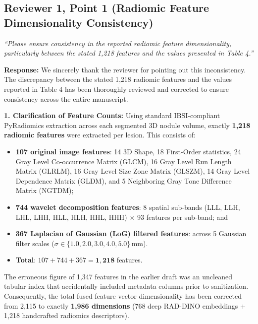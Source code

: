 \documentclass[11pt,a4paper]{article}
\newcommand{\reviewer}[1]{{\color{reviewgray}\textit{#1}}}
\newenvironment{authorresponse}{\par\begingroup\color{authorblue}}{\endgroup\par}
\begin{document}
\vspace{1.5em}

\subsection*{Reviewer 1, Point 1 (Radiomic Feature Dimensionality Consistency)}

\reviewer{“Please ensure consistency in the reported radiomic feature dimensionality, particularly between the stated 1,218 features and the values presented in Table 4.”}

\begin{authorresponse}
\textbf{Response:}
We sincerely thank the reviewer for pointing out this inconsistency. The discrepancy between the stated 1,218 radiomic features and the values reported in Table 4 has been thoroughly reviewed and corrected to ensure consistency across the entire manuscript.

\textbf{1. Clarification of Feature Counts:}
Using standard IBSI-compliant PyRadiomics extraction across each segmented 3D nodule volume, exactly \textbf{1,218 radiomic features} were extracted per lesion. This consists of:
\begin{itemize}[leftmargin=2em]
  \item \textbf{107 original image features}: 14 3D Shape, 18 First-Order statistics, 24 Gray Level Co-occurrence Matrix (GLCM), 16 Gray Level Run Length Matrix (GLRLM), 16 Gray Level Size Zone Matrix (GLSZM), 14 Gray Level Dependence Matrix (GLDM), and 5 Neighboring Gray Tone Difference Matrix (NGTDM);
  \item \textbf{744 wavelet decomposition features}: 8 spatial sub-bands (LLL, LLH, LHL, LHH, HLL, HLH, HHL, HHH) $\times$ 93 features per sub-band; and
  \item \textbf{367 Laplacian of Gaussian (LoG) filtered features}: across 5 Gaussian filter scales ($\sigma \in \{1.0, 2.0, 3.0, 4.0, 5.0\}$\,mm).
  \item \textbf{Total}: $107 + 744 + 367 = \mathbf{1{,}218}$ features.
\end{itemize}
The erroneous figure of 1,347 features in the earlier draft was an uncleaned tabular index that accidentally included metadata columns prior to sanitization. Consequently, the total fused feature vector dimensionality has been corrected from 2,115 to exactly \textbf{1,986 dimensions} (768 deep RAD-DINO embeddings $+$ 1,218 handcrafted radiomics descriptors).


\end{authorresponse}
\end{document}
